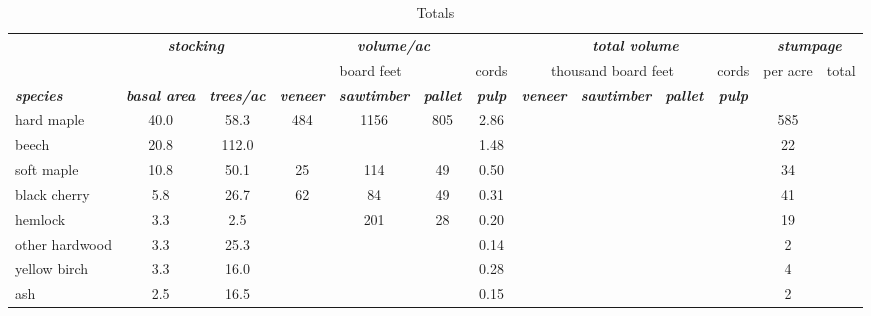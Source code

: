 \documentclass[landscape]{article}
\begin{document}
\begin{table}[H]

\caption{\label{tab:unnamed-chunk-23}Totals}
\fontsize{10}{12}\selectfont
\begin{tabular}[t]{lcccccccccccc}
\toprule
\multicolumn{1}{c}{\em{\textbf{ }}} & \multicolumn{2}{c}{\em{\textbf{stocking}}} & \multicolumn{4}{c}{\em{\textbf{volume/ac }}} & \multicolumn{4}{c}{\em{\textbf{total volume}}} & \multicolumn{2}{c}{\em{\textbf{stumpage}}} \\
\cmidrule(l{3pt}r{3pt}){2-3} \cmidrule(l{3pt}r{3pt}){4-7} \cmidrule(l{3pt}r{3pt}){8-11} \cmidrule(l{3pt}r{3pt}){12-13}
\multicolumn{3}{c}{ } & \multicolumn{3}{c}{board feet} & \multicolumn{1}{c}{cords} & \multicolumn{3}{c}{thousand board feet} & \multicolumn{1}{c}{cords} & \multicolumn{1}{c}{per acre} & \multicolumn{1}{c}{total} \\
\cmidrule(l{3pt}r{3pt}){4-6} \cmidrule(l{3pt}r{3pt}){7-7} \cmidrule(l{3pt}r{3pt}){8-10} \cmidrule(l{3pt}r{3pt}){11-11} \cmidrule(l{3pt}r{3pt}){12-12} \cmidrule(l{3pt}r{3pt}){13-13}
\rowcolor[HTML]{DCDCDC}  \em{\textbf{species}} & \em{\textbf{basal area}} & \em{\textbf{trees/ac}} & \em{\textbf{veneer}} & \em{\textbf{sawtimber}} & \em{\textbf{pallet}} & \em{\textbf{pulp}} & \em{\textbf{veneer}} & \em{\textbf{sawtimber}} & \em{\textbf{pallet}} & \em{\textbf{pulp}} & \em{\textbf{ }} & \em{\textbf{ }}\\
\midrule
\rowcolor{gray!6}  hard maple & 40.0 & 58.3 & 484 & 1156 & 805 & 2.86 &  &  &  &  & 585 & \\
 
beech & 20.8 & 112.0 &  &  &  & 1.48 &  &  &  &  & 22 & \\
 
\rowcolor{gray!6}  soft maple & 10.8 & 50.1 & 25 & 114 & 49 & 0.50 &  &  &  &  & 34 & \\
 
black cherry & 5.8 & 26.7 & 62 & 84 & 49 & 0.31 &  &  &  &  & 41 & \\
 
\rowcolor{gray!6}  hemlock & 3.3 & 2.5 &  & 201 & 28 & 0.20 &  &  &  &  & 19 & \\
 
other hardwood & 3.3 & 25.3 &  &  &  & 0.14 &  &  &  &  & 2 & \\
 
\rowcolor{gray!6}  yellow birch & 3.3 & 16.0 &  &  &  & 0.28 &  &  &  &  & 4 & \\
 
ash & 2.5 & 16.5 &  &  &  & 0.15 &  &  &  &  & 2 & \\
 

\end{tabular}
\end{table}
\end{document}
